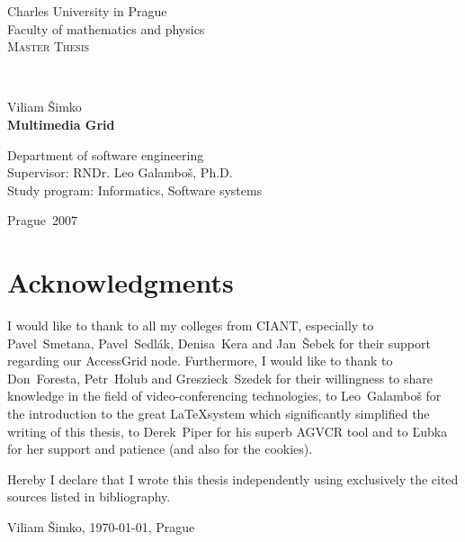 \hypersetup{pageanchor=false}
\begin{titlepage}
	\begin{center}

		\begin{Large}
		Charles University in Prague \\
		Faculty of mathematics and physics\\
		\vfill
		\textsc{Master Thesis} \\
		\end{Large}
		\vfill

		 \\

		\vfill

		\begin{Large}
		Viliam Šimko \\
		\textbf{Multimedia Grid} \\
		\end{Large}

		\vfill

		Department of software engineering \\
		Supervisor: RNDr. Leo Galamboš, Ph.D. \\
		Study program: Informatics, Software systems
		
		\vfill
		
		Prague~2007
	\end{center}
\end{titlepage}
\hypersetup{pageanchor=true}

\pagebreak

\noindent
\section*{Acknowledgments}
I would like to thank to all my colleges from CIANT, especially to Pavel~Smetana, Pavel~Sedlák, Denisa~Kera and Jan~Šebek for their support regarding our AccessGrid node. Furthermore, I would like to thank to Don~Foresta, Petr~Holub and Greszieck~Szedek for their willingness to share knowledge in the field of video-conferencing technologies, to Leo~Galamboš for the introduction to the great \LaTeX system which significantly simplified the writing of this thesis, to Derek~Piper for his superb AGVCR tool and to Ľubka for her support and patience (and also for the cookies).

\vfill

\noindent
Hereby I declare that I wrote this thesis independently using exclusively the cited sources listed in bibliography.

\begin{flushright}
Viliam Šimko, \today, Prague
\end{flushright}
